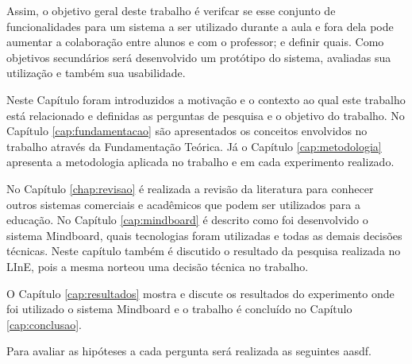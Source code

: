Assim, o objetivo geral deste trabalho é verifcar se esse conjunto de funcionalidades para um sistema a ser utilizado durante a aula e fora dela pode aumentar a colaboração entre alunos e com o professor; e definir quais. Como objetivos secundários será desenvolvido um protótipo do sistema, avaliadas sua utilização e também sua usabilidade.


Neste Capítulo foram introduzidos a motivação e o contexto ao qual este trabalho está relacionado e definidas as perguntas de pesquisa e o objetivo do trabalho. No Capítulo \ref{cap:fundamentacao} são apresentados os conceitos envolvidos no trabalho através da Fundamentação Teórica. Já o Capítulo \ref{cap:metodologia} apresenta a metodologia aplicada no trabalho e em cada experimento realizado. 

No Capítulo \ref{chap:revisao} é realizada a revisão da literatura para conhecer outros sistemas comerciais e acadêmicos que podem ser utilizados para a educação. No Capítulo \ref{cap:mindboard} é descrito como foi desenvolvido o sistema Mindboard, quais tecnologias foram utilizadas e todas as demais decisões técnicas. Neste capítulo também é discutido o resultado da pesquisa realizada no LInE, pois a mesma norteou uma decisão técnica no trabalho.

O Capítulo \ref{cap:resultados} mostra e discute os resultados do experimento onde foi utilizado o sistema Mindboard e o trabalho é concluído no Capítulo \ref{cap:conclusao}.

\iffalse

Para avaliar as hipóteses a cada pergunta será realizada as seguintes aasdf.




